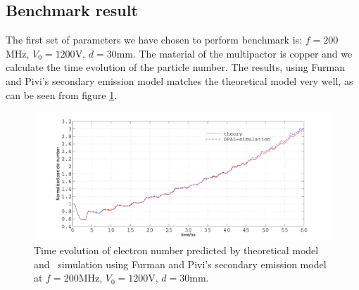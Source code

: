 \documentclass[a4paper,11pt]{article}
\begin{document}
\subsection{Benchmark result}
The first set of parameters we have chosen to perform benchmark is: $f=200$MHz, $V_0=1200$V, $d=30$mm. The material of the multipactor is copper and we calculate the time evolution of the particle number. The results, using  Furman and Pivi's secondary emission model matches the theoretical model very well, as can be seen from figure \ref{fig:results}.   
\begin{figure}[H]
\begin{center}
\includegraphics[width=1\textwidth]{match.pdf}
\end{center}
\caption{Time evolution of electron number predicted by theoretical model and \opal\ simulation using Furman and Pivi's secondary emission model at $f=200$MHz, $V_0=1200$V, $d=30$mm.\label{fig:results}}
\end{figure}
\end{document}
